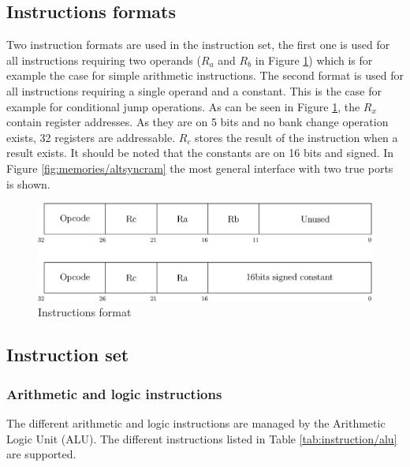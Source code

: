 \subsection{Instructions formats}

Two instruction formats are used in the instruction set, the first one is used for all instructions 
requiring two operands ($R_a$ and $R_b$ in Figure \ref{fig:instructions/format}) which is for example 
the case for simple arithmetic instructions. The second format is used for all instructions 
requiring a single operand and a constant. This is the case for example for conditional jump 
operations. As can be seen in Figure \ref{fig:instructions/format}, the $R_x$ contain register 
addresses. As they are on 5 bits and no bank change operation exists, 32 registers are addressable. 
$R_c$ stores the result of the instruction when a result exists. It should be noted that the 
constants are on 16 bits and signed. In Figure \ref{fig:memories/altsyncram} the most general interface 
with two true ports is shown. 

\begin{figure}[H]
    \centering
    \includegraphics[scale=0.6]{Chapter3-CPU/res/instruction}
    \caption{Instructions format}
    \label{fig:instructions/format}
\end{figure}

\subsection{Instruction set}

\subsubsection*{Arithmetic and logic instructions}

The different arithmetic and logic instructions are managed by the Arithmetic Logic Unit (ALU). The 
different instructions listed in Table \ref{tab:instruction/alu} are supported.

